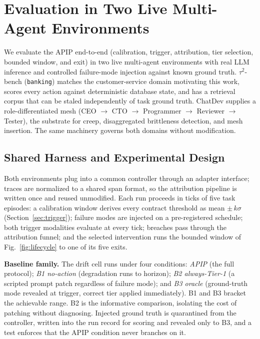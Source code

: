 \documentclass[conference]{IEEEtran}
\newcommand{\code}[1]{\texttt{\small #1}}
\begin{document}
\section{Evaluation in Two Live Multi-Agent Environments}
\label{sec:evaluation}

We evaluate the APIP end-to-end (calibration, trigger, attribution, tier
selection, bounded window, and exit) in two live multi-agent environments with
real LLM inference and controlled failure-mode injection against known ground
truth. $\tau^2$-bench (\code{banking}) \cite{barres2025} matches the
customer-service domain motivating this work, scores every action against
deterministic database state, and has a retrieval corpus that can be staled
independently of task ground truth. ChatDev \cite{qian2024} supplies a
role-differentiated mesh (CEO $\rightarrow$ CTO $\rightarrow$ Programmer
$\rightarrow$ Reviewer $\rightarrow$ Tester), the substrate for creep,
disaggregated brittleness detection, and mesh insertion. The same machinery
governs both domains without modification.

\subsection{Shared Harness and Experimental Design}

Both environments plug into a common controller through an adapter interface;
traces are normalized to a shared span format, so the attribution pipeline is
written once and reused unmodified. Each run proceeds in ticks of five
task episodes: a calibration
window derives every contract threshold as mean $\pm\,k\sigma$
(Section~\ref{sec:trigger}); failure modes are injected on a pre-registered
schedule; both trigger modalities evaluate at every tick; breaches pass through
the attribution funnel; and the selected intervention runs the bounded window
of Fig.~\ref{fig:lifecycle} to one of its five exits.

\textbf{Baseline family.} The drift cell runs under four conditions:
\emph{APIP} (the full protocol); \emph{B1 no-action} (degradation runs to
horizon); \emph{B2 always-Tier-1} (a scripted prompt patch regardless of
failure mode); and
\emph{B3 oracle} (ground-truth mode revealed at trigger, correct tier applied
immediately). B1 and B3 bracket the achievable range. B2 is the informative
comparison, isolating the cost of patching without diagnosing. Injected ground truth
is quarantined from the controller, written into the run record for scoring and
revealed only to B3, and a test enforces that the APIP condition never branches
on it.
\end{document}

